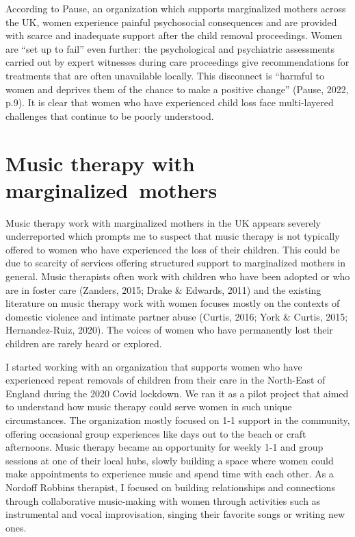 \documentclass[authordate, empirical]{jote-new-article}
\begin{document}
According to Pause, an organization which supports marginalized mothers across the UK, women experience painful psychosocial consequences and are provided with scarce and inadequate support after the child removal proceedings. Women are “set up to fail” even further: the psychological and psychiatric assessments carried out by expert witnesses during care proceedings give recommendations for treatments that are often unavailable locally. This disconnect is “harmful to women and deprives them of the chance to make a positive change” (Pause, 2022, p.9). It is clear that women who have experienced child loss face multi-layered challenges that continue to be poorly understood.







\section{Music therapy with \mbox{marginalized mothers}}







Music therapy work with marginalized mothers in the UK appears severely underreported which prompts me to suspect that music therapy is not typically offered to women who have experienced the loss of their children. This could be due to scarcity of services offering structured support to marginalized mothers in general. Music therapists often work with children who have been adopted or who are in foster care (Zanders, 2015; Drake \& Edwards, 2011) and the existing literature on music therapy work with women focuses mostly on the contexts of domestic violence and intimate partner abuse (Curtis, 2016; York \& Curtis, 2015; Hernandez-Ruiz, 2020). The voices of women who have permanently lost their children are rarely heard or explored.







I started working with an organization that supports women who have experienced repeat removals of children from their care in the North-East of England during the 2020 Covid lockdown. We ran it as a pilot project that aimed to understand how music therapy could serve women in such unique circumstances. The organization mostly focused on 1-1 support in the community, offering occasional group experiences like days out to the beach or craft afternoons. Music therapy became an opportunity for weekly 1-1 and group sessions at one of their local hubs, slowly building a space where women could make appointments to experience music and spend time with each other. As a Nordoff Robbins therapist, I focused on building relationships and connections through collaborative music-making with women through activities such as instrumental and vocal improvisation, singing their favorite songs or writing new ones.
\end{document}
